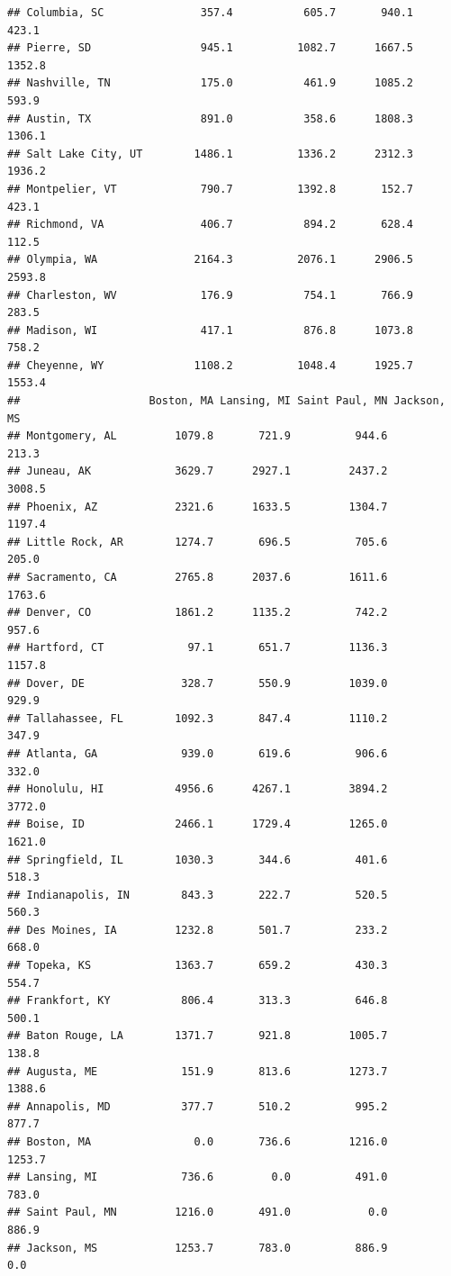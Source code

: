 \documentclass[
]{article}
\begin{document}
\begin{verbatim}
## Columbia, SC               357.4           605.7       940.1         423.1
## Pierre, SD                 945.1          1082.7      1667.5        1352.8
## Nashville, TN              175.0           461.9      1085.2         593.9
## Austin, TX                 891.0           358.6      1808.3        1306.1
## Salt Lake City, UT        1486.1          1336.2      2312.3        1936.2
## Montpelier, VT             790.7          1392.8       152.7         423.1
## Richmond, VA               406.7           894.2       628.4         112.5
## Olympia, WA               2164.3          2076.1      2906.5        2593.8
## Charleston, WV             176.9           754.1       766.9         283.5
## Madison, WI                417.1           876.8      1073.8         758.2
## Cheyenne, WY              1108.2          1048.4      1925.7        1553.4
##                    Boston, MA Lansing, MI Saint Paul, MN Jackson, MS
## Montgomery, AL         1079.8       721.9          944.6       213.3
## Juneau, AK             3629.7      2927.1         2437.2      3008.5
## Phoenix, AZ            2321.6      1633.5         1304.7      1197.4
## Little Rock, AR        1274.7       696.5          705.6       205.0
## Sacramento, CA         2765.8      2037.6         1611.6      1763.6
## Denver, CO             1861.2      1135.2          742.2       957.6
## Hartford, CT             97.1       651.7         1136.3      1157.8
## Dover, DE               328.7       550.9         1039.0       929.9
## Tallahassee, FL        1092.3       847.4         1110.2       347.9
## Atlanta, GA             939.0       619.6          906.6       332.0
## Honolulu, HI           4956.6      4267.1         3894.2      3772.0
## Boise, ID              2466.1      1729.4         1265.0      1621.0
## Springfield, IL        1030.3       344.6          401.6       518.3
## Indianapolis, IN        843.3       222.7          520.5       560.3
## Des Moines, IA         1232.8       501.7          233.2       668.0
## Topeka, KS             1363.7       659.2          430.3       554.7
## Frankfort, KY           806.4       313.3          646.8       500.1
## Baton Rouge, LA        1371.7       921.8         1005.7       138.8
## Augusta, ME             151.9       813.6         1273.7      1388.6
## Annapolis, MD           377.7       510.2          995.2       877.7
## Boston, MA                0.0       736.6         1216.0      1253.7
## Lansing, MI             736.6         0.0          491.0       783.0
## Saint Paul, MN         1216.0       491.0            0.0       886.9
## Jackson, MS            1253.7       783.0          886.9         0.0

\end{verbatim}
\end{document}
